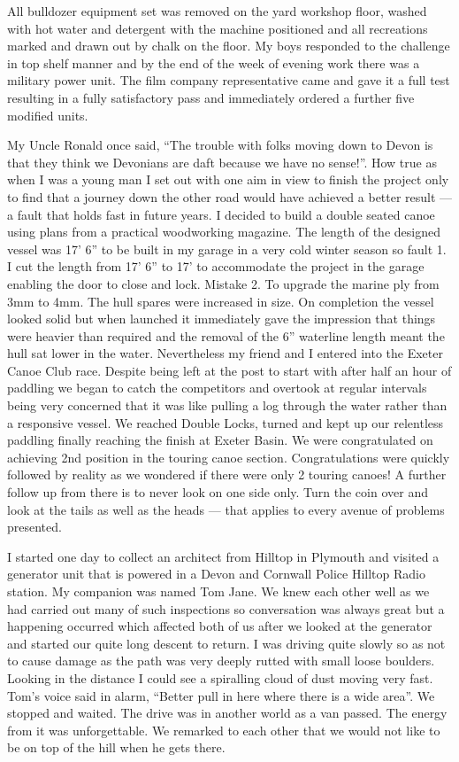 All bulldozer equipment set was removed on the yard workshop floor, washed with
hot water and detergent with the machine positioned and all recreations marked
and drawn out by chalk on the floor. My boys responded to the challenge in top
shelf manner and by the end of the week of evening work there was a military
power unit. The film company representative came and gave it a full test
resulting in a fully satisfactory pass and immediately ordered a further five
modified units.

My Uncle Ronald once said, ``The trouble with folks moving down to Devon is that they
think we Devonians are daft because we have no sense!''. How true as when I was a young man I set out with one aim in view to
finish the project only to find that a journey down the other road would have
achieved a better result --- a fault that holds fast in future years.
I decided to build a double seated canoe using plans from a practical
woodworking magazine. The length of the designed vessel was 17' 6'' to be
built in my garage in a very cold winter season so fault 1. I cut the length
from 17' 6'' to 17' to accommodate the project in the garage enabling the door
to close and lock.
Mistake 2. To upgrade the marine ply from 3mm to 4mm. The hull spares were
increased in size. On completion the vessel looked solid but when launched it
immediately gave the impression that things were heavier than required and the
removal of the 6'' waterline length meant the hull sat lower in the water.
Nevertheless my friend and I entered into the Exeter Canoe Club race. Despite
being left at the post to start with after half an hour of paddling we began to
catch the competitors and overtook at regular intervals being very concerned
that it was like pulling a log through the water rather than a responsive
vessel. We reached Double Locks, turned and kept up our relentless paddling
finally reaching the finish at Exeter Basin. We were congratulated on
achieving 2nd position in the touring canoe section.
Congratulations were quickly followed by reality as we wondered if there were
only 2 touring canoes! A further follow up from there is to never look on one
side only. Turn the coin over and look at the tails as well as the heads ---
that applies to every avenue of problems presented.





I started one day to collect an architect from Hilltop in Plymouth and visited
a generator unit that is powered in a Devon and Cornwall Police Hilltop Radio
station. My companion was named Tom Jane.   We knew each other well as we
had carried out many of such inspections so conversation was always great but a
happening occurred which affected both of us after we looked at the generator
and started our quite long descent to return. I was driving quite slowly so as
not to cause damage as the path was very deeply rutted with small loose
boulders. Looking in the distance I could see a spiralling cloud of dust
moving very fast. Tom's voice said in alarm, ``Better pull in here where there
is a wide area''. We stopped and waited. The drive was in another world as a
van passed. The energy from it was unforgettable. We remarked to each other
that we would not like to be on top of the hill when he gets there.

